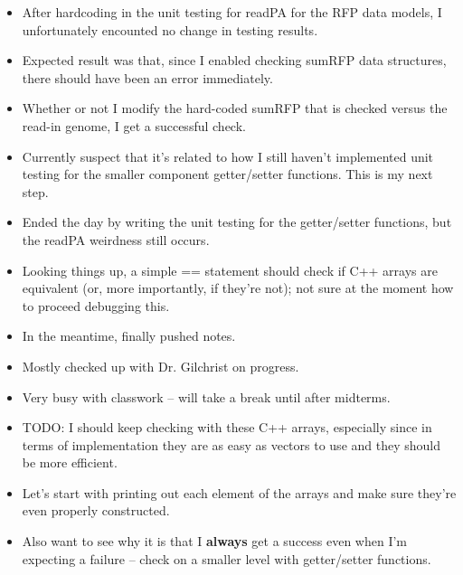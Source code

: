 \documentclass[12pt,hyperref]{labbook}
\begin{document}

\begin{itemize}
    \item After hardcoding in the unit testing for readPA for the RFP data models, I unfortunately encounted no change in testing results.
    \item Expected result was that, since I enabled checking sumRFP data structures, there should have been an error immediately.
    \item Whether or not I modify the hard-coded sumRFP that is checked versus the read-in genome, I get a successful check.
    \item Currently suspect that it's related to how I still haven't implemented unit testing for the smaller component getter/setter functions. This is my next step.
    \item Ended the day by writing the unit testing for the getter/setter functions, but the readPA weirdness still occurs.
    \item Looking things up, a simple == statement should check if C++ arrays are equivalent (or, more importantly, if they're not); not sure at the moment how to proceed debugging this.
    \item In the meantime, finally pushed notes.
\end{itemize}


\begin{itemize}
    \item Mostly checked up with Dr. Gilchrist on progress.
    \item Very busy with classwork -- will take a break until after midterms.
    \item TODO: I should keep checking with these C++ arrays, especially since in terms of implementation they are as easy as vectors to use and they should be more efficient.
    \item Let's start with printing out each element of the arrays and make sure they're even properly constructed.
    \item Also want to see why it is that I \textbf{always} get a success even when I'm expecting a failure -- check on a smaller level with getter/setter functions.
\end{itemize}

\end{document}
